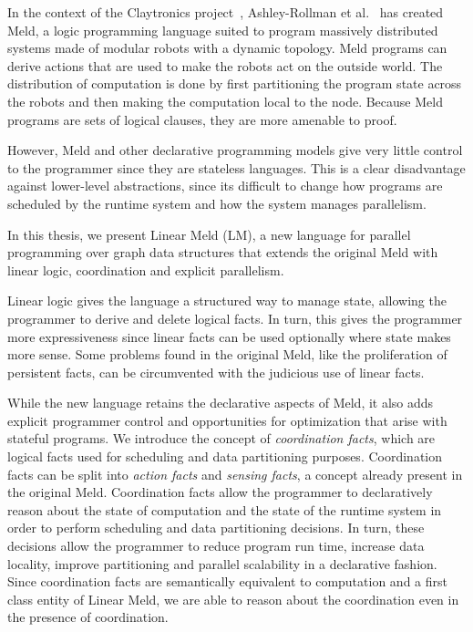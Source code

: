 In the context of the Claytronics project~\cite{goldstein-computer05},
Ashley-Rollman et al.~\cite{ashley-rollman-iclp09,
ashley-rollman-derosa-iros07wksp} has created Meld, a logic programming
language suited to program massively distributed systems made of modular
robots with a dynamic topology.  Meld programs can derive actions that are
used to make the robots act on the outside world. The distribution of
computation is done by first partitioning the program state across the
robots and then making the computation local to the node. Because Meld
programs are sets of logical clauses, they are more amenable to proof.

However, Meld and other declarative programming models give very little control
to the programmer since they are stateless languages.  This is a clear
disadvantage against lower-level abstractions, since its difficult to change how
programs are scheduled by the runtime system and how the system manages
parallelism.

In this thesis, we present Linear Meld (LM), a new language for parallel
programming over graph data structures that extends the original Meld with
linear logic, coordination and explicit parallelism.

Linear logic gives the language a structured way to manage state, allowing the
programmer to derive and delete logical facts. In turn, this gives the
programmer more expressiveness since linear facts can be used optionally where
state makes more sense. Some problems found in the original Meld, like the
proliferation of persistent facts, can be circumvented with the judicious use of
linear facts.

While the new language retains the declarative aspects of Meld, it also adds
explicit programmer control and opportunities for optimization that arise with
stateful programs.  We introduce the concept of \emph{coordination facts}, which
are logical facts used for scheduling and data partitioning purposes.
Coordination facts can be split into \emph{action facts} and \emph{sensing
facts}, a concept already present in the original Meld. Coordination facts
allow the programmer to declaratively reason about the state of computation
and the state of the runtime system in order to perform scheduling and data
partitioning decisions. In turn, these decisions allow the programmer to
reduce program run time, increase data locality, improve partitioning and
parallel scalability in a declarative fashion. Since coordination facts are
semantically equivalent to computation and a first class entity of Linear
Meld, we are able to reason about the coordination even in the presence of
coordination.

